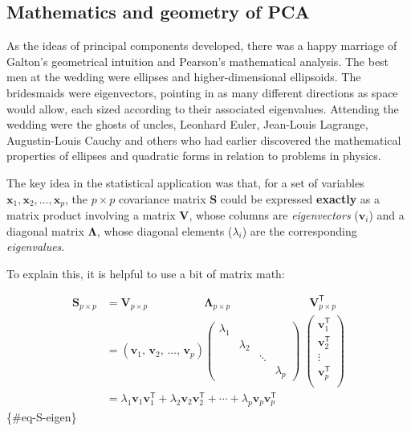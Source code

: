 \documentclass[
  letterpaper,
  10pt,
  krantz2]{krantz}
\begin{document}
\subsection{Mathematics and geometry of
PCA}\label{mathematics-and-geometry-of-pca}

As the ideas of principal components developed, there was a happy
marriage of Galton's geometrical intuition and Pearson's mathematical
analysis. The best men at the wedding were ellipses and
higher-dimensional ellipsoids. The bridesmaids were eigenvectors,
pointing in as many different directions as space would allow, each
sized according to their associated eigenvalues. Attending the wedding
were the ghosts of uncles, Leonhard Euler, Jean-Louis Lagrange,
Augustin-Louis Cauchy and others who had earlier discovered the
mathematical properties of ellipses and quadratic forms in relation to
problems in physics.

The key idea in the statistical application was that, for a set of
variables \(\mathbf{x}_1, \mathbf{x}_2, \dots, \mathbf{x}_p\), the
\(p \times p\) covariance matrix \(\mathbf{S}\) could be expressed
\textbf{exactly} as a matrix product involving a matrix \(\mathbf{V}\),
whose columns are \emph{eigenvectors} (\(\mathbf{v}_i\)) and a diagonal
matrix \(\mathbf{\Lambda}\), whose diagonal elements (\(\lambda_i\)) are
the corresponding \emph{eigenvalues}.

To explain this, it is helpful to use a bit of matrix math:

\begin{align}
\mathbf{S}_{p \times p} & = \mathbf{V}_{p \times p} \phantom{0000000000} 
                            \mathbf{\Lambda}_{p \times p} \phantom{00000000000000}
                            \mathbf{V}_{p \times p}^\mathsf{T} \\
           & = \left( \mathbf{v}_1, \, \mathbf{v}_2, \,\dots, \, \mathbf{v}_p \right)
           \begin{pmatrix}
             \lambda_1 &  &  & \\ 
             & \lambda_2  &   & \\ 
             &  & \ddots & \\ 
             &  &  & \lambda_p 
            \end{pmatrix}
            \;
            \begin{pmatrix}
            \mathbf{v}_1^\mathsf{T}\\ 
            \mathbf{v}_2^\mathsf{T}\\ 
            \vdots\\ 
            \mathbf{v}_p^\mathsf{T}\\ 
            \end{pmatrix}
           \\
           & = \lambda_1 \mathbf{v}_1 \mathbf{v}_1^\mathsf{T} + \lambda_2 \mathbf{v}_2 \mathbf{v}_2^\mathsf{T} + \cdots + \lambda_p \mathbf{v}_p \mathbf{v}_p^\mathsf{T}
\end{align} \{\#eq-S-eigen\}
\end{document}
